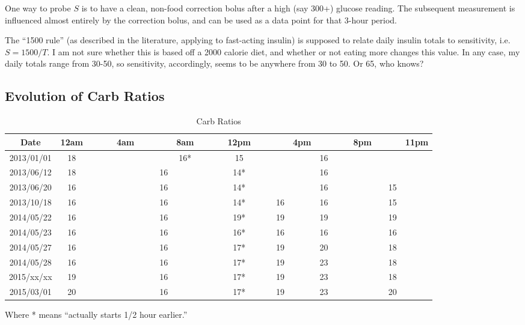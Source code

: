 One way to probe $S$ is to have a clean, non-food correction bolus after a high (say 300+) glucose 
reading. The subsequent measurement is influenced almost entirely by the correction bolus, and can 
be used as a data point for that 3-hour period.

The ``1500 rule'' (as described in the literature, applying to fast-acting insulin) is supposed to 
relate daily insulin totals to sensitivity, i.e. $S=1500/T$. I am not sure whether this is based off 
a 2000 calorie diet, and whether or not eating more changes this value. In any case, my daily totals 
range from 30-50, so sensitivity, accordingly, seems to be anywhere from 30 to 50. Or 65, who knows?

\subsection{Evolution of Carb Ratios}

\begin{table}[h]
\caption{Carb Ratios}
\footnotesize
\begin{center}
\begin{tabular}{|c|c|c|c|c|c|c|c|c|c|c|c|c|c|c|c|c|c|c|c|c|c|c|c|c|}
\hline
Date       & 12am & & & & 4am & & &    & 8am & & & & 12pm & & &    & 4pm &    & & & 8pm & &    & 11pm \\ \hline
2013/01/01 & 18   & & & &     & & &    & 16* & & & & 15   & & &    &     & 16 & & &     & &    &      \\
2013/06/12 & 18   & & & &     & & & 16 &     & & & & 14*  & & &    &     & 16 & & &     & &    &      \\
2013/06/20 & 16   & & & &     & & & 16 &     & & & & 14*  & & &    &     & 16 & & &     & & 15 &      \\
2013/10/18 & 16   & & & &     & & & 16 &     & & & & 14*  & & & 16 &     & 16 & & &     & & 15 &      \\
2014/05/22 & 16   & & & &     & & & 16 &     & & & & 19*  & & & 19 &     & 19 & & &     & & 19 &      \\
2014/05/23 & 16   & & & &     & & & 16 &     & & & & 16*  & & & 16 &     & 16 & & &     & & 16 &      \\
2014/05/27 & 16   & & & &     & & & 16 &     & & & & 17*  & & & 19 &     & 20 & & &     & & 18 &      \\
2014/05/28 & 16   & & & &     & & & 16 &     & & & & 17*  & & & 19 &     & 23 & & &     & & 18 &      \\
2015/xx/xx & 19   & & & &     & & & 16 &     & & & & 17*  & & & 19 &     & 23 & & &     & & 18 &      \\
2015/03/01 & 20   & & & &     & & & 16 &     & & & & 17*  & & & 19 &     & 23 & & &     & & 20 &      \\
\hline
\end{tabular}
\end{center}
\label{default}
\end{table}%
Where * means ``actually starts 1/2 hour earlier.''

